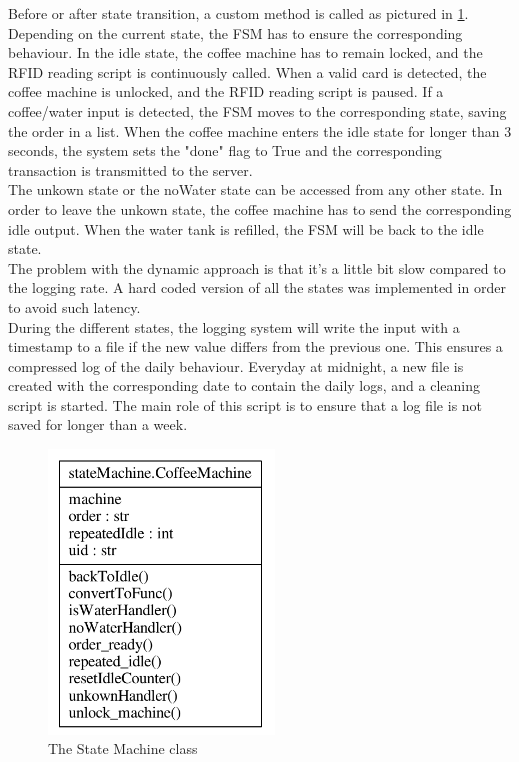 \documentclass[12pt]{article}
\begin{document}
   Before or after state transition, a custom method is called as pictured in \ref{fig:stateMachineClass}.
  Depending on the current state, the FSM has to ensure the corresponding behaviour.
  In the idle state, the coffee machine has to remain locked, and the RFID reading script is continuously called.
  When a valid card is detected, the coffee machine is unlocked, and the RFID reading script is paused.
  If a coffee/water input is detected, the FSM moves to the corresponding state, saving the order in a list. 
  When the coffee machine enters the idle state for longer than 3 seconds, the system sets the "done" flag to True and the corresponding transaction is transmitted to the server.\\
  
  The unkown state or the noWater state can be accessed from any other state. In order to leave the unkown state, the coffee machine has to send the corresponding idle output.
  When the water tank is refilled, the FSM will be back to the idle state.\\
  
  The problem with the dynamic approach is that it's a little bit slow compared to the logging rate. A hard coded version of all the states was implemented in order to avoid such latency.\\
  During the different states, the logging system will write the input with a timestamp to a file if the new value differs from the previous one.
  This ensures a compressed log of the daily behaviour.
  Everyday at midnight, a new file is created with the corresponding date to contain the daily logs, and a cleaning script is started. 
  The main role of this script is to ensure that a log file is not saved for longer than a week.\\
  
  \begin{figure}[H]
   \centering
   \includegraphics[width=6cm]{./images/stateMachineClasses.pdf}
   \captionsetup{justification=centering}
   \caption{The State Machine class}
   \label{fig:stateMachineClass}
  \end{figure}
  
\end{document}
